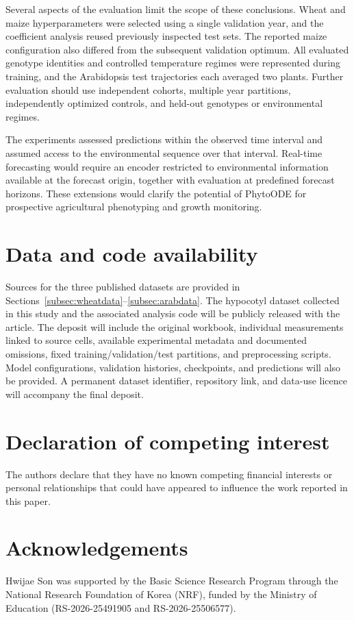 \documentclass[preprint,12pt,authoryear]{elsarticle}
\begin{document}
Several aspects of the evaluation limit the scope of these conclusions. Wheat and maize hyperparameters were selected using a single validation year, and the coefficient analysis reused previously inspected test sets. The reported maize configuration also differed from the subsequent validation optimum. All evaluated genotype identities and controlled temperature regimes were represented during training, and the Arabidopsis test trajectories each averaged two plants. Further evaluation should use independent cohorts, multiple year partitions, independently optimized controls, and held-out genotypes or environmental regimes.

The experiments assessed predictions within the observed time interval and assumed access to the environmental sequence over that interval. Real-time forecasting would require an encoder restricted to environmental information available at the forecast origin, together with evaluation at predefined forecast horizons. These extensions would clarify the potential of PhytoODE for prospective agricultural phenotyping and growth monitoring.

\section*{Data and code availability}
Sources for the three published datasets are provided in Sections~\ref{subsec:wheatdata}--\ref{subsec:arabdata}. The hypocotyl dataset collected in this study and the associated analysis code will be publicly released with the article. The deposit will include the original workbook, individual measurements linked to source cells, available experimental metadata and documented omissions, fixed training/validation/test partitions, and preprocessing scripts. Model configurations, validation histories, checkpoints, and predictions will also be provided. A permanent dataset identifier, repository link, and data-use licence will accompany the final deposit.

\section*{Declaration of competing interest}
The authors declare that they have no known competing financial interests or personal relationships that could have appeared to influence the work reported in this paper.

\section*{Acknowledgements}
Hwijae Son was supported by the Basic Science Research Program through the National Research Foundation of Korea (NRF), funded by the Ministry of Education (RS-2026-25491905 and RS-2026-25506577).



\end{document}
